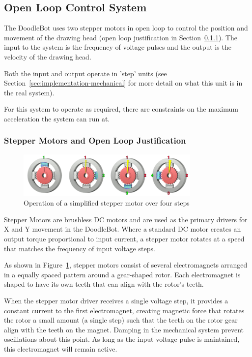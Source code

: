 \subsection{Open Loop Control System}
	The DoodleBot uses two stepper motors in open loop to control the position and movement of the drawing head (open loop justification in Section~\ref{sec:control-stepper}). The input to the system is the frequency of voltage pulses and the output is the velocity of the drawing head. 
	
	Both the input and output operate in 'step' units (see Section~\ref*{sec:implementation-mechanical} for more detail on what this unit is in the real system).
	
	For this system to operate as required, there are constraints on the maximum acceleration the system can run at.
	
	\subsubsection{Stepper Motors and Open Loop Justification}
		\label{sec:control-stepper}
		\begin{figure}[h]
			\centering
			\includegraphics[width=0.8\textwidth]{figures/optimisation/steppermotor}
			\caption{Operation of a simplified stepper motor over four steps}
			\label{fig:stepper}
		\end{figure}
			
		Stepper Motors are brushless DC motors and are used as the primary drivers for X and Y movement in the DoodleBot. Where a standard DC motor creates an output torque proportional to input current, a stepper motor rotates at a speed that matches the frequency of input voltage steps.
		
		As shown in Figure~\ref{fig:stepper}, stepper motors consist of several electromagnets arranged in a equally spaced pattern around a gear-shaped rotor. Each electromagnet is shaped to have its own teeth that can align with the rotor's teeth. 
		
		When the stepper motor driver receives a single voltage step, it provides a constant current to the first electromagnet, creating magnetic force that rotates the rotor a small amount (a single step) such that the teeth on the rotor gear align with the teeth on the magnet. Damping in the mechanical system prevent oscillations about this point. As long as the input voltage pulse is maintained, this electromagnet will remain active.
		
